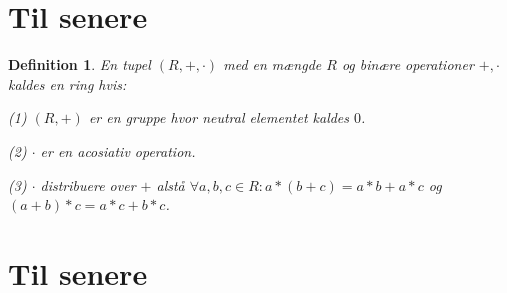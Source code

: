 \documentclass{article}
\newtheorem{defi}{Definition}
\begin{document}
{	\section*{Til senere}
		\begin{defi}
			En tupel $(R,+,\cdot)$ med en mængde $R$ og binære operationer $+, \cdot$
			kaldes en ring hvis:

			(1) $(R,+)$ er en gruppe hvor neutral elementet kaldes $0$.

			(2) $\cdot$ er en acosiativ operation.

			(3) $\cdot$ distribuere over $+$ alstå $\forall a,b,c \in R: a*(b+c)=a*b+a*c$
			og $(a+b)*c = a*c+b*c$.
		\end{defi}
	\section*{Til senere}
	}
\end{document}

